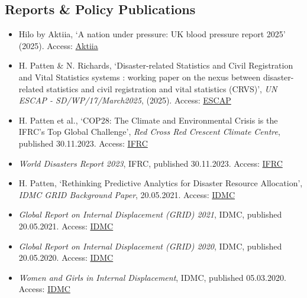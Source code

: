 \documentclass[a4paper,10pt]{article}
\begin{document}
\subsection*{Reports \& Policy Publications}
\begin{itemize}[leftmargin=*,noitemsep]
  \item Hilo by Aktiia, `A nation under pressure: UK blood pressure report 2025' (2025). Access: \href{https://hilo.com/uk/bp-report-2025/?srsltid=AfmBOoqoZO2R-vYM6bqqg5fRD50CchthXeD-OJmGSbu8x2bMiZ7gvKKW}{Aktiia} 
  \item H. Patten \& N. Richards, `Disaster-related Statistics and Civil Registration and Vital Statistics systems : working paper on the nexus between disaster-related statistics and civil registration and vital statistics (CRVS)', \textit{UN ESCAP - SD/WP/17/March2025}, (2025). Access: \href{https://hdl.handle.net/20.500.12870/7973}{ESCAP}
  \item H. Patten et al., `COP28: The Climate and Environmental Crisis is the IFRC’s Top Global Challenge', \textit{Red Cross Red Crescent Climate Centre}, published 30.11.2023. Access: \href{https://www.climatecentre.org/13011/cop28-the-climate-and-environmental-crisis-is-the-ifrcs-top-global-challenge-by-the-climate-centre/}{IFRC}
  \item \textit{World Disasters Report 2023}, IFRC, published 30.11.2023. Access: \href{https://www.ifrc.org/document/world-disasters-report-2022}{IFRC}
  \item H. Patten, `Rethinking Predictive Analytics for Disaster Resource Allocation', \textit{IDMC GRID Background Paper}, 20.05.2021. Access: \href{https://www.internal-displacement.org/global-report/grid2021/downloads/background_papers/background_paper-analytics.pdf}{IDMC}
  \item \textit{Global Report on Internal Displacement (GRID) 2021}, IDMC, published 20.05.2021. Access: \href{https://api.internal-displacement.org/sites/default/files/publications/documents/grid2021_idmc.pdf}{IDMC}
  \item \textit{Global Report on Internal Displacement (GRID) 2020}, IDMC, published 20.05.2020. Access: \href{https://api.internal-displacement.org/sites/default/files/publications/documents/2020-IDMC-GRID.pdf}{IDMC}
  \item \textit{Women and Girls in Internal Displacement}, IDMC, published 05.03.2020. Access: \href{https://api.internal-displacement.org/sites/default/files/publications/documents/202003-twice-invisible-internally-displaced-women.pdf}{IDMC}
\end{itemize}
\end{document}
